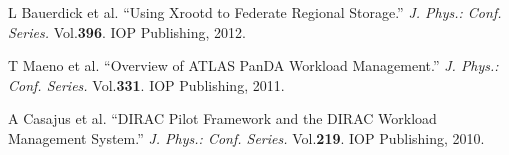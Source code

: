 \documentclass{PoS}
\begin{document}
\begin{thebibliography}{99}
L Bauerdick et al. ``Using Xrootd to Federate Regional Storage.'' \textit{J. Phys.: Conf. Series.} Vol.\textbf{396}. IOP Publishing, 2012.

T Maeno et al. ``Overview of ATLAS PanDA Workload Management.'' \textit{J. Phys.: Conf. Series.} Vol.\textbf{331}. IOP Publishing, 2011.


A Casajus et al. ``DIRAC Pilot Framework and the DIRAC
Workload Management System.'' \textit{J. Phys.: Conf. Series.} Vol.\textbf{219}. IOP Publishing, 2010.











\end{thebibliography}
\end{document}
